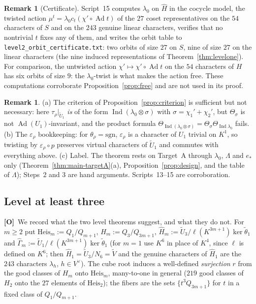 \documentclass[11pt]{article}
\newcommand{\Ind}{\operatorname{Ind}}
\newcommand{\Ad}{\operatorname{Ad}}
\newcommand{\tU}{\widetilde U}
\newcommand{\tV}{\widetilde V}
\newcommand{\tth}{\widetilde\theta}
\newcommand{\Otag}{\textnormal{\textbf{[O]}}}
\theoremstyle{plain}
\theoremstyle{definition}
\newtheorem{remark}[theorem]{Remark}
\begin{document}
\begin{remark}[Certificate]
Script~15 computes $\lambda_0$ on $\hat H$ in the cocycle model, the
twisted action $\mu^t=\lambda_0c_t(\chi'\circ\Ad t)$ of the $27$ coset
representatives on the $54$ characters of $S$ and on the $243$ genuine
linear characters, verifies that no nontrivial $t$ fixes any of them,
and writes the orbit table to \texttt{level2\_orbit\_certificate.txt}:
two orbits of size $27$ on $S$, nine of size $27$ on the linear
characters (the nine induced representations of
Theorem~\ref{thm:levelone}).  For comparison, the untwisted action
$\chi'\mapsto\chi'\circ\Ad t$ on the $54$ characters of $H$ has six
orbits of size $9$: the $\lambda_0$-twist is what makes the action free.
These computations corroborate Proposition~\ref{prop:free} and are not
used in its proof.
\end{remark}

\begin{remark}
(a) The criterion of Proposition~\ref{prop:criterion} is sufficient but
not necessary: here $\tau_\rho|_{\tU_1}$ \emph{is} of the form
$\Ind(\lambda_0\otimes\sigma)$ with $\sigma=\chi_1'+\chi_2'$, but
$\Theta_\sigma$ is not $\Ad(U_1)$-invariant, and the product formula
$\Theta_{\Ind(\lambda_0\otimes\sigma)}=\Theta_\sigma\Theta_{\Ind\lambda_0}$
fails.
(b) The $\varepsilon_\rho$ bookkeeping: for $\theta_\rho=\mathrm{sgn}$,
$\varepsilon_\rho$ is a character of $U_1$ trivial on $K^1$, so twisting
by $\varepsilon_\rho\circ p$ preserves virtual characters of $\tU_1$ and
commutes with everything above.
(c) Label.  The theorem rests on Target~A through $\lambda_0$, $\Lambda$
and $e_*$ only (Theorem~\ref{thm:main-targetA}(a),
Proposition~\ref{prop:design}, and the table of $\Lambda$); Steps~2 and
3 are hand arguments.  Scripts~13--15 are corroboration.
\end{remark}

\subsection{Level at least three}\label{subsec:cuberoot}
\Otag\ We record what the two level theorems suggest, and what they do
not.  For $m\ge2$ put $\mathrm{Heis}_m:=Q_1/Q_{m+1}$, $H_m:=Q_3/Q_{3m+1}$,
$\hat H_m:=\tU_3/\ell(K^{3m+1})\ker\tth_1$ and
$\hat\Gamma_m:=\tU_1/\ell(K^{3m+1})\ker\tth_1$ (for $m=1$ use $K^6$ in
place of $K^4$, since $\ell$ is defined on $K^6$; then
$\hat H_1=\tU_3/N_6=\tV$ and the genuine characters of $\hat H_1$ are the
$243$ characters $\lambda_h$, $h\in V^\vee$).  The cube root induces a
well-defined \emph{surjection} $r$ from the good classes of $H_m$ onto
$\mathrm{Heis}_m$, many-to-one in general ($219$ good classes of $H_2$
onto the $27$ elements of $\mathrm{Heis}_2$); the fibers are the sets
$\{t^3Q_{3m+1}\}$ for $t$ in a fixed class of $Q_1/Q_{m+1}$.
\end{document}
